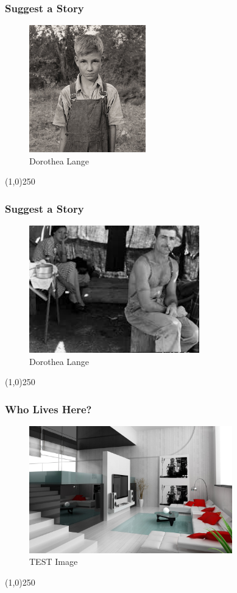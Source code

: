 \begin{frame}
\frametitle{Suggest a Story}
\begin{figure}
	\centering
		\includegraphics[height=5.5cm]{img/candc/DorethaLange2.jpg}
	\caption{Dorothea Lange}
	\label{fig:DorotheaLange2}
\end{figure}
\end{frame}
\begin{center}\line(1,0){250}\end{center}



\begin{frame}
\frametitle{Suggest a Story}
\begin{figure}
	\centering
		\includegraphics[height=5.5cm]{img/candc/DorethaLange3.jpg}
	\caption{Dorothea Lange}
	\label{fig:DorotheaLange3}
\end{figure}
\end{frame}
\begin{center}\line(1,0){250}\end{center}


\begin{frame}
\frametitle{Who Lives Here?}
\begin{figure}
	\centering
	\includegraphics[height=5.5cm]{img/A.jpg}
	\caption{TEST Image}
	\label{fig:SampleImageA}
\end{figure}
\end{frame}
\begin{center}\line(1,0){250}\end{center}



